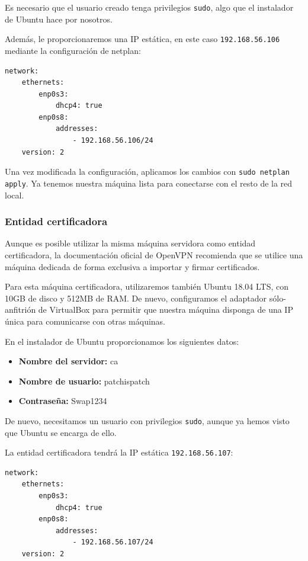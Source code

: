 \documentclass[11pt,a4paper]{article}
\begin{document}
Es necesario que el usuario creado tenga privilegios \texttt{sudo}, algo que el instalador de Ubuntu hace por nosotros.

Además, le proporcionaremos una IP estática, en este caso \texttt{192.168.56.106} mediante la configuración de netplan:

\begin{lstlisting}[tabsize=4]
network:
	ethernets:
		enp0s3:
			dhcp4: true
		enp0s8:
			addresses:
				- 192.168.56.106/24
	version: 2
\end{lstlisting}

Una vez modificada la configuración, aplicamos los cambios con \texttt{sudo netplan apply}. Ya tenemos nuestra máquina lista para conectarse con el resto de la red local.


\subsubsection{Entidad certificadora}

Aunque es posible utilizar la misma máquina servidora como entidad certificadora, la documentación oficial de OpenVPN recomienda que se utilice una máquina dedicada de forma exclusiva a importar y firmar certificados.

\medskip

Para esta máquina certificadora, utilizaremos también Ubuntu 18.04 LTS, con 10GB de disco y 512MB de RAM. De nuevo, configuramos el adaptador sólo-anfitrión de VirtualBox para permitir que nuestra máquina disponga de una IP única para comunicarse con otras máquinas.

\medskip

En el instalador de Ubuntu proporcionamos los siguientes datos:

\begin{itemize}
\item \textbf{Nombre del servidor:} ca
\item \textbf{Nombre de usuario:} patchispatch
\item \textbf{Contraseña:} Swap1234
\end{itemize}

De nuevo, necesitamos un usuario con privilegios \texttt{sudo}, aunque ya hemos visto que Ubuntu se encarga de ello.

La entidad certificadora tendrá la IP estática \texttt{192.168.56.107}:

\begin{lstlisting}[tabsize=4]
network:
	ethernets:
		enp0s3:
			dhcp4: true
		enp0s8:
			addresses:
				- 192.168.56.107/24
	version: 2
\end{lstlisting}
\end{document}
